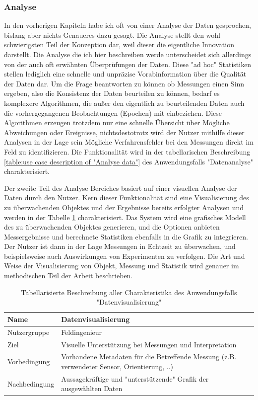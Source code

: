 \subsubsection{Analyse}
In den vorherigen Kapiteln habe ich oft von einer Analyse der Daten gesprochen, bislang aber nichts Genaueres dazu gesagt. Die Analyse stellt den wohl schwierigsten Teil der Konzeption dar, weil dieser die eigentliche Innovation darstellt. Die Analyse die ich hier beschreiben werde unterscheidet sich allerdings von der auch oft erwähnten Überprüfungen der Daten. Diese "ad hoc" Statistiken stellen lediglich eine schnelle und unpräzise Vorabinformation über die Qualität der Daten dar. Um die Frage beantworten zu können ob Messungen einen Sinn ergeben, also die Konsistenz der Daten beurteilen zu können, bedarf es komplexere Algorithmen, die außer den eigentlich zu beurteilenden Daten auch die vorhergegangenen Beobachtungen (Epochen) mit einbeziehen. Diese Algorithmen erzeugen trotzdem nur eine schnelle Übersicht über Mögliche Abweichungen oder Ereignisse, nichtsdestotrotz wird der Nutzer mithilfe dieser Analysen in der Lage sein Mögliche Verfahrensfehler bei den Messungen direkt im Feld zu identifizieren. Die Funktionalität wird in der tabellarischen Beschreibung \ref{table:use case description of "Analyse data"} des Anwendungsfalls "Datenanalyse" charakterisiert.

Der zweite Teil des Analyse Bereiches basiert auf einer visuellen Analyse der Daten durch den Nutzer. Kern dieser Funktionalität sind eine Visualisierung des zu überwachenden Objektes und der Ergebnisse bereits erfolgter Analysen und werden in der Tabelle \ref{table:use case description "Visualise data"} charakterisiert. Das System wird eine grafisches Modell des zu überwachenden Objektes generieren, und die Optionen anbieten Messergebnisse und berechnete Statistiken ebenfalls in die Grafik zu integrieren. Der Nutzer ist dann in der Lage Messungen in Echtzeit zu überwachen, und beispielsweise auch Auswirkungen von Experimenten zu verfolgen. Die Art und Weise der Visualisierung von Objekt, Messung und Statistik wird genauer im methodischen Teil der Arbeit beschrieben.

\begin{table}[H]
\centering
\begin{tabular}{l | p{11cm}}
Name & Datenvisualisierung\\ \hline 
Nutzergruppe & Feldingenieur\\ \hline 
Ziel & Visuelle Unterstützung bei Messungen und Interpretation\\ \hline 
Vorbedingung & Vorhandene Metadaten für die Betreffende Messung (z.B. verwendeter Sensor, Orientierung, ..)\\ \hline 
Nachbedingung & Aussagekräftige und "unterstützende" Grafik der ausgewählten Daten\\
\end{tabular}
\caption{Tabellarisierte Beschreibung aller Charakteristika des Anwendungsfalls "Datenvisualisierung"} 
\label{table:use case description "Visualise data"}
\end{table}

